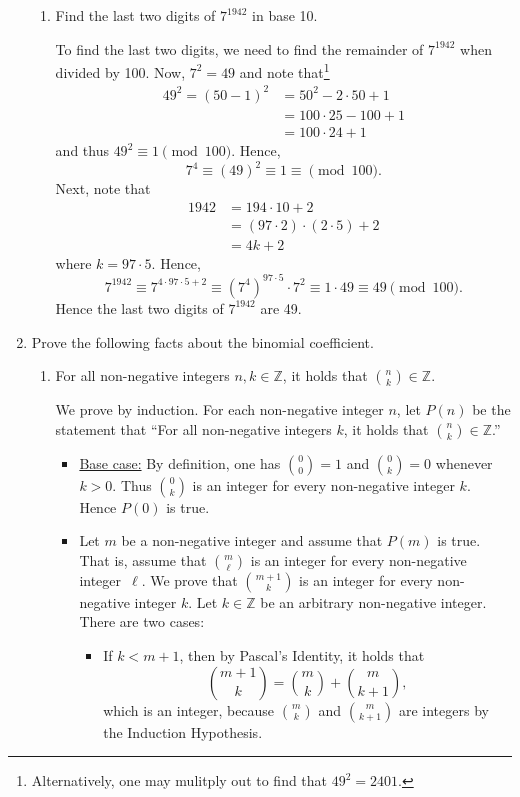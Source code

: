 \documentclass[11pt]{article}
\def\integers{\mathbb{Z}}
\begin{document}
\begin{enumerate}
\begin{enumerate}
\item Find the last two digits of $7^{1942}$ in base 10.
\begin{Solution}
 To find the last two digits, we need to find the remainder of $7^{1942}$ when divided by 100. Now, $7^2=49$ and note that\footnote{Alternatively, one may mulitply out to find that $49^2 = 2401$.} 
 \begin{align*}
  49^2 = (50-1)^2 &= 50^2 - 2\cdot 50 + 1 \\
  &= 100 \cdot 25 - 100 + 1\\
  &=100\cdot 24 + 1
 \end{align*}
and thus $49^2\equiv 1\pmod{100}$. Hence,
\[
 7^4\equiv (49)^2\equiv 1\equiv \pmod{100}.
\]
Next, note that 
\begin{align*}
 1942 &= 194\cdot 10 + 2\\ & = (97\cdot 2)\cdot (2\cdot 5) + 2\\
  & = 4k + 2
\end{align*}
where $k = 97\cdot 5$. Hence,
\[
 7^{1942} \equiv 7^{4\cdot 97\cdot 5 + 2} \equiv (7^4)^{97\cdot 5} \cdot 7^2 \equiv 1\cdot 49\equiv 49\pmod{100}.
\]
Hence the last two digits of $7^{1942}$ are 49.
\end{Solution}

\end{enumerate}

\item Prove the following facts about the binomial coefficient.\label{binomprob}
\begin{enumerate}
\item For all non-negative integers $n,k\in\integers$, it holds that $\displaystyle\binom{n}{k}\in\integers$.
\begin{Solution}
 We prove by induction. For each non-negative integer $n$, let $P(n)$ be the statement that ``For all non-negative integers $k$, it holds that $\displaystyle\binom{n}{k}\in\integers$.''
 \begin{itemize}
 \item \underline{Base case:} By definition, one has $\binom{0}{0}=1$ and $\binom{0}{k}=0$ whenever $k>0$. Thus $\binom{0}{k}$ is an integer for every non-negative integer $k$. Hence $P(0)$ is true.
 \item \underline{} Let $m$ be a non-negative integer and assume that $P(m)$ is true. That is, assume that $\binom{m}{\ell}$ is an integer for every non-negative integer~$\ell$. We prove that $\binom{m+1}{k}$ is an integer for every non-negative integer $k$. Let $k\in\integers$ be an arbitrary non-negative integer. There are two cases:
 \begin{itemize}
  \item If $k<m+1$, then by Pascal's Identity, it holds that
  \[
   \binom{m+1}{k} = \binom{m}{k} + \binom{m}{k+1},
  \]
  which is an integer, because $\binom{m}{k}$ and $\binom{m}{k+1}$ are integers by the Induction Hypothesis.


\end{itemize}
\end{itemize}
\end{Solution}
\end{enumerate}
\end{enumerate}
\end{document}
